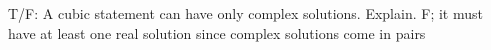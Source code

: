 {T/F: A cubic statement can have only complex solutions. Explain.}
{F; it must have at least one real solution since complex solutions come in pairs}
